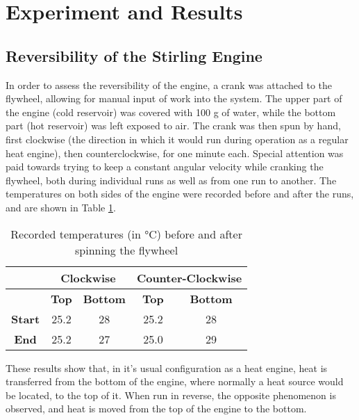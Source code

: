 \documentclass[titlepage]{article}
\begin{document}
\newpage
\section{Experiment and Results}

\subsection{Reversibility of the Stirling Engine}
In order to assess the reversibility of the engine, a crank was attached to the flywheel, allowing for manual input of work into the system. The upper part of the engine (cold reservoir) was covered with 100 g of water, while the bottom part (hot reservoir) was left exposed to air.
The crank was then spun by hand, first clockwise (the direction in which it would run during operation as a regular heat engine), then counterclockwise, for one minute each. Special attention was paid towards trying to keep a constant angular velocity while cranking the flywheel, both during individual runs as well as from one run to another.
The temperatures on both sides of the engine were recorded before and after the runs, and are shown in Table \ref{tb_manual_temps}.

\begin{table}[h]
\centering
\begin{tabular}{|c|c|c|c|c|}
    \hline
    & \multicolumn{2}{|c|}{\textbf{Clockwise}} & \multicolumn{2}{|c|}{\textbf{Counter-Clockwise}}
    \\
    \hline
    & \textbf{Top} & \textbf{Bottom} & \textbf{Top} & \textbf{Bottom}
    \\
    \hline
    \textbf{Start} & 25.2 & 28 & 25.2 & 28
    \\
    \hline
    \textbf{End} & 25.2 & 27 & 25.0 & 29
    \\
    \hline
\end{tabular}
\caption{Recorded temperatures (in °C) before and after spinning the flywheel}
\label{tb_manual_temps}
\end{table}
%
\noindent These results show that, in it's usual configuration as a heat engine, heat is transferred from the bottom of the engine, where normally a heat source would be located, to the top of it. When run in reverse, the opposite phenomenon is observed, and heat is moved from the top of the engine to the bottom.
\end{document}
